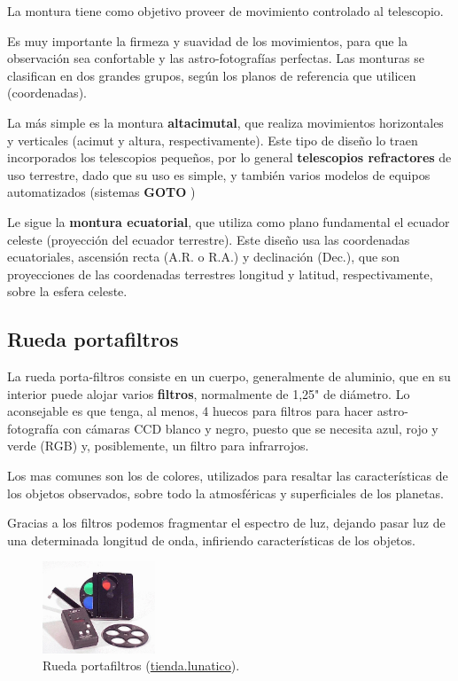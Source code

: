 \bigskip
La montura tiene como objetivo proveer de movimiento controlado al telescopio.

\bigskip
Es muy importante la firmeza y suavidad de los movimientos, para que la observación sea confortable y las astro-fotografías perfectas. Las monturas se clasifican en dos grandes grupos, según los planos de referencia que utilicen (coordenadas).

\bigskip
La más simple es la montura \textbf{altacimutal}, que realiza movimientos horizontales y verticales (acimut y altura, respectivamente). Este tipo de diseño lo traen incorporados los telescopios pequeños, por lo general \textbf{telescopios refractores} de uso terrestre, dado que su uso es simple, y también varios modelos de equipos automatizados (sistemas \textbf{GOTO} )

\bigskip
Le sigue la \textbf{montura ecuatorial}, que utiliza como plano fundamental el ecuador celeste (proyección del ecuador terrestre). Este diseño usa las coordenadas ecuatoriales, ascensión recta (A.R. o R.A.) y declinación (Dec.), que son proyecciones de las coordenadas terrestres longitud y latitud, respectivamente, sobre la esfera celeste.


\subsection{Rueda portafiltros}

La rueda porta-filtros consiste en un cuerpo, generalmente de aluminio, que en su interior puede alojar varios \textbf{filtros}, normalmente de 1,25" de diámetro. Lo aconsejable es que tenga, al menos, 4 huecos para filtros para hacer astro-fotografía con cámaras CCD blanco y negro, puesto que se necesita  azul, rojo y verde (RGB) y, posiblemente, un filtro para infrarrojos.

\bigskip
Los mas comunes son los de colores, utilizados para resaltar las características de los objetos observados, sobre todo la atmosféricas y superficiales de los planetas.

\bigskip
Gracias a los filtros podemos fragmentar el espectro de luz, dejando pasar luz de una determinada longitud de onda, infiriendo características de los objetos.


\bigskip
\begin{figure}[!ht]
	\begin{center}
		\includegraphics[width=0.3\textwidth]{../images/portafiltros.jpg}
		\caption[Rueda portafiltros]{Rueda portafiltros (\href{https://astroimagen.wordpress.com/productos/optec/ruedas-de-filtros-ifw/}{tienda.lunatico}).}
		\label{fig:portaf}
	\end{center}
\end{figure}



